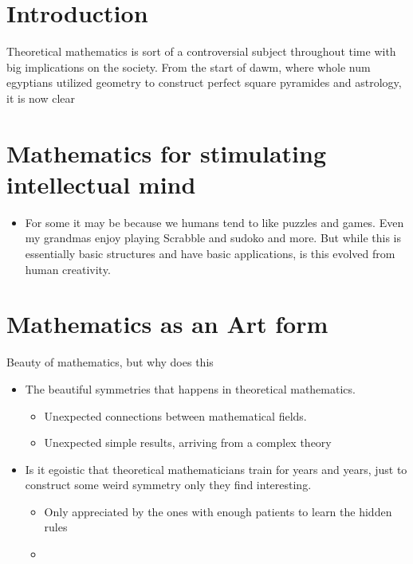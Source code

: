 \documentclass[10pt,conference]{IEEEtran}
\begin{document}
\begin{sloppy}
\section{Introduction}\label{sec:introduction}

Theoretical mathematics is sort of a controversial subject throughout time with big implications on the society. From the start of dawm, where whole num egyptians utilized geometry to construct perfect square pyramides and astrology, it is now clear



\newpage
\section{Mathematics for stimulating intellectual mind}%
\label{sec:mathematics_for_stimulating_intellectual_mind}

\begin{itemize}
    \item For some it may be because we humans tend to like puzzles and games. Even my grandmas enjoy playing Scrabble and sudoko and more. But while this is essentially basic structures and have basic applications, is this evolved from human creativity.
\end{itemize}


\newpage
\section{Mathematics as an Art form}%
\label{sec:mathematics_for_stimulating_intellectual_mind}

Beauty of mathematics, but why does this
\begin{itemize}
    \item The beautiful symmetries that happens in theoretical mathematics.
        \begin{itemize}
            \item Unexpected connections between mathematical fields.
            \item Unexpected simple results, arriving from a complex theory
        \end{itemize}
    \item Is it egoistic that theoretical mathematicians train for years and years, just to construct some weird symmetry only they find interesting.
        \begin{itemize}
            \item Only appreciated by the ones with enough patients to learn the hidden rules
            \item
        \end{itemize}
\end{itemize}


\end{sloppy}
\end{document}
